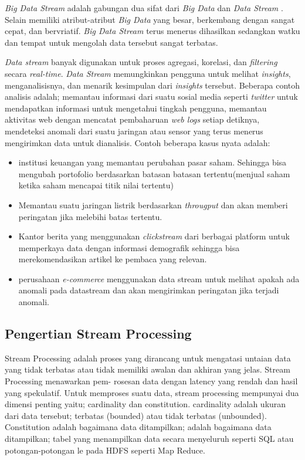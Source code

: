  \textit{Big Data Stream } adalah gabungan dua sifat dari \textit{Big Data} dan \textit{Data Stream}
 . Selain memiliki atribut-atribut \textit{Big Data} yang besar, berkembang dengan sangat cepat,
 dan bervriatif. \textit{Big Data Stream} terus menerus dihasilkan sedangkan watku dan tempat untuk
 mengolah data tersebut sangat terbatas. 
		
\textit{Data stream} banyak digunakan untuk proses agregasi, korelasi, dan 					
\textit{filtering} secara \textit{real-time}. \textit{Data Stream} memungkinkan pengguna 				
untuk melihat \textit{insights}, menganalisisnya, dan menarik kesimpulan dari 							
\textit{insights} tersebut. Beberapa contoh analisis adalah; memantau informasi dari suatu 				
sosial media seperti \textit{twitter} untuk mendapatkan informasi untuk mengetahui tingkah 				
pengguna, memantau aktivitas web dengan mencatat pembaharuan \textit{web logs} setiap 					
detiknya, mendeteksi anomali dari suatu jaringan atau sensor yang terus menerus mengirimkan 			
data untuk dianalisis. Contoh beberapa kasus nyata adalah:

\begin{itemize}
	\item institusi keuangan yang memantau perubahan pasar saham. Sehingga bisa mengubah 			
	portofolio berdasarkan batasan batasan tertentu(menjual saham ketika saham mencapai titik 		
	nilai tertentu)
	\item Memantau suatu jaringan listrik berdasarkan \textit{througput} dan akan memberi 			
	peringatan jika melebihi batas tertentu.
	\item Kantor berita yang menggunakan \textit{clickstream} dari berbagai platform untuk 			
	memperkaya data dengan informasi demografik sehingga bisa merekomendasikan artikel ke 			
	pembaca yang relevan.
	\item perusahaan \textit{e-commerce} menggunakan data stream untuk melihat apakah ada 			
	anomali pada datastream dan akan mengirimkan peringatan jika terjadi anomali.
\end{itemize}



\subsection{Pengertian Stream Processing}
Stream Processing adalah proses yang dirancang untuk mengatasi untaian data yang tidak
terbatas atau tidak memiliki awalan dan akhiran yang jelas. Stream Processing menawarkan pem-
rosesan data dengan latency yang rendah dan hasil yang spekulatif. Untuk memproses suatu data,
stream processing mempunyai dua dimensi penting yaitu; cardinality dan constitution. cardinality
adalah ukuran dari data tersebut; terbatas (bounded) atau tidak terbatas (unbounded). Constitution
adalah bagaimana data ditampilkan; adalah bagaimana data ditampilkan; tabel yang menampilkan
data secara menyeluruh seperti SQL atau potongan-potongan le pada HDFS seperti Map Reduce.

